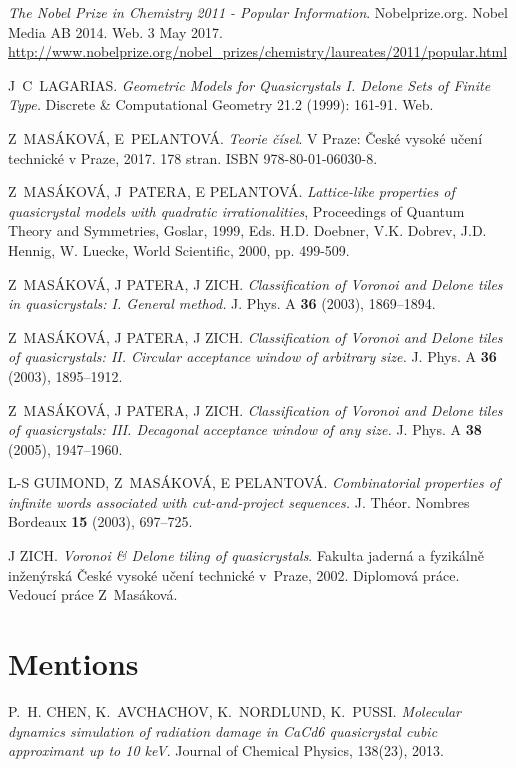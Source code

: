 \documentclass[text.tex]{subfiles}
\begin{document}
\begin{thebibliography}{9}

\emph{The Nobel Prize in Chemistry 2011 - Popular Information}. Nobelprize.org. Nobel Media AB 2014. Web. 3 May 2017. \url{http://www.nobelprize.org/nobel_prizes/chemistry/laureates/2011/popular.html}

J~C~LAGARIAS. \emph{Geometric Models for Quasicrystals I. Delone Sets of Finite Type.} Discrete \& Computational Geometry 21.2 (1999): 161-91. Web.

Z~MASÁKOVÁ, E~PELANTOVÁ. \emph{Teorie čísel}. V Praze: České vysoké učení technické v Praze, 2017. 178 stran. ISBN 978-80-01-06030-8.

Z~MASÁKOVÁ, J~PATERA, E PELANTOVÁ. \emph{Lattice-like properties of quasicrystal models with quadratic irrationalities},  Proceedings of Quantum Theory and Symmetries, Goslar, 1999, Eds. H.D. Doebner, V.K. Dobrev, J.D. Hennig, W. Luecke, World Scientific, 2000, pp. 499-509.

	Z~MASÁKOVÁ, J PATERA, J ZICH. \emph{Classification of Voronoi and Delone tiles in quasicrystals: I. General method.} J. Phys. A \textbf{36} (2003), 1869--1894.

	Z~MASÁKOVÁ, J PATERA, J ZICH. \emph{Classification of Voronoi and Delone tiles of quasicrystals: II. Circular acceptance window of arbitrary size.} J. Phys. A \textbf{36} (2003), 1895--1912.

	Z~MASÁKOVÁ, J PATERA, J ZICH. \emph{Classification of Voronoi and Delone tiles of quasicrystals: III. Decagonal acceptance window of any size.} J. Phys. A \textbf{38} (2005), 1947--1960.

	L-S GUIMOND, Z~MASÁKOVÁ, E PELANTOVÁ. \emph{Combinatorial properties of infinite words associated with cut-and-project
 sequences.} J. Théor. Nombres Bordeaux \textbf{15} (2003), 697--725.
	
	J ZICH. \emph{Voronoi \& Delone tiling of quasicrystals}. Fakulta jaderná a fyzikálně inženýrská České vysoké učení technické v~Praze, 2002. Diplomová práce. Vedoucí práce Z~Masáková.

\section*{Mentions}
\uppercase{P.~H. Chen, K.~Avchachov, K.~Nordlund, K.~Pussi.} 
\emph {Molecular dynamics simulation of radiation damage in CaCd6 quasicrystal cubic approximant up to 10 keV}. {Journal of Chemical Physics}, {138}({23}), {2013}.


\end{thebibliography}
\end{document}
